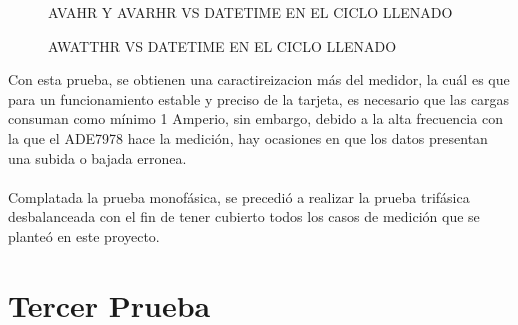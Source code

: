\begin{figure}[H]
  \hfill
  \hfill
  \hfill
  \caption{AVAHR Y AVARHR VS DATETIME EN EL CICLO LLENADO}
  \end{figure}
\begin{figure}[H]
  \hfill
  \hfill
  \caption{AWATTHR VS DATETIME EN EL CICLO LLENADO}
  \end{figure}

  Con esta prueba, se obtienen una caractireizacion más del medidor, la cuál es que para un funcionamiento estable y preciso de la tarjeta, es necesario que las cargas consuman como mínimo 1 Amperio, sin embargo, debido a la alta frecuencia con la que el ADE7978 hace la medición, hay ocasiones en que los datos presentan una subida o bajada erronea. \\\\
  Complatada la prueba monofásica, se precedió a realizar la prueba trifásica desbalanceada con el fin de tener cubierto todos los casos de medición que se planteó en este proyecto.
  \section{Tercer Prueba}
